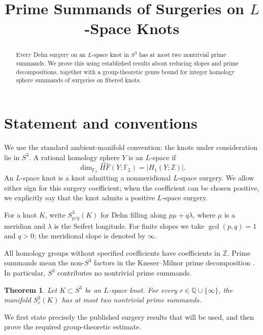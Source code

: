 \documentclass[11pt]{article}
\title{Prime Summands of Surgeries on \(L\)-Space Knots}
\author{}
\date{}
\newcommand{\Z}{\mathbb{Z}}
\newcommand{\F}{\mathbb{F}_2}
\newcommand{\surg}[2]{S^3_{#1}(#2)}
\newtheorem{theorem}{Theorem}
\begin{document}
\maketitle

\begin{abstract}
Every Dehn surgery on an \(L\)-space knot in \(S^3\) has at most two
nontrivial prime summands. We prove this using established results about
reducing slopes and prime decompositions, together with a
group-theoretic genus bound for integer homology sphere summands of
surgeries on fibered knots.
\end{abstract}

\section{Statement and conventions}

We use the standard ambient-manifold convention: the knots under
consideration lie in \(S^3\). A rational homology sphere \(Y\) is an
\(L\)-space if
\[
    \dim_{\F}\widehat{HF}(Y;\F)=|H_1(Y;\Z)|.
\]
An \(L\)-space knot is a knot admitting a nonmeridional \(L\)-space
surgery. We allow either sign for this surgery coefficient; when the
coefficient can be chosen positive, we explicitly say that the knot
admits a positive \(L\)-space surgery.

For a knot \(K\), write \(\surg{p/q}{K}\) for Dehn filling along
\(p\mu+q\lambda\), where \(\mu\) is a meridian and \(\lambda\) is the
Seifert longitude. For finite slopes we take \(\gcd(p,q)=1\) and \(q>0\);
the meridional slope is denoted by \(\infty\).

All homology groups without specified coefficients have coefficients
in \(\Z\). Prime summands mean the non-\(S^3\) factors in the
Kneser--Milnor prime decomposition
\cite[Theorem~1]{Milnor}. In particular, \(S^3\) contributes no
nontrivial prime summands.

\begin{theorem}\label{thm:main}
Let \(K\subset S^3\) be an \(L\)-space knot. For every
\(r\in\mathbb{Q}\cup\{\infty\}\), the manifold \(\surg{r}{K}\) has at most
two nontrivial prime summands.
\end{theorem}

We first state precisely the published surgery results that will be
used, and then prove the required group-theoretic estimate.
\end{document}
